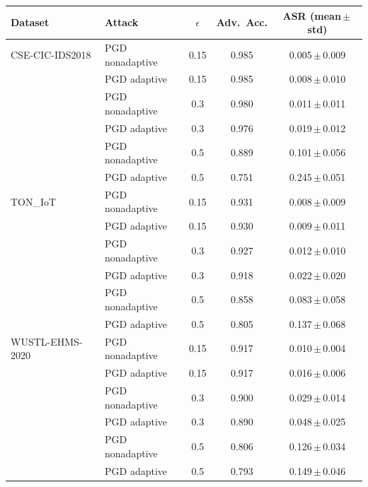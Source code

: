 \begin{tabular}{l l c c c}
\toprule
\textbf{Dataset} & \textbf{Attack} & $\epsilon$ & \textbf{Adv.\ Acc.} & \textbf{ASR} (mean\,$\pm$\,std) \\
\midrule
CSE-CIC-IDS2018 & PGD nonadaptive & 0.15 & 0.985 & 0.005\,$\pm$\,0.009 \\
 & PGD adaptive & 0.15 & 0.985 & 0.008\,$\pm$\,0.010 \\
 & PGD nonadaptive & 0.3 & 0.980 & 0.011\,$\pm$\,0.011 \\
 & PGD adaptive & 0.3 & 0.976 & 0.019\,$\pm$\,0.012 \\
 & PGD nonadaptive & 0.5 & 0.889 & 0.101\,$\pm$\,0.056 \\
 & PGD adaptive & 0.5 & 0.751 & 0.245\,$\pm$\,0.051 \\
TON\_IoT & PGD nonadaptive & 0.15 & 0.931 & 0.008\,$\pm$\,0.009 \\
 & PGD adaptive & 0.15 & 0.930 & 0.009\,$\pm$\,0.011 \\
 & PGD nonadaptive & 0.3 & 0.927 & 0.012\,$\pm$\,0.010 \\
 & PGD adaptive & 0.3 & 0.918 & 0.022\,$\pm$\,0.020 \\
 & PGD nonadaptive & 0.5 & 0.858 & 0.083\,$\pm$\,0.058 \\
 & PGD adaptive & 0.5 & 0.805 & 0.137\,$\pm$\,0.068 \\
WUSTL-EHMS-2020 & PGD nonadaptive & 0.15 & 0.917 & 0.010\,$\pm$\,0.004 \\
 & PGD adaptive & 0.15 & 0.917 & 0.016\,$\pm$\,0.006 \\
 & PGD nonadaptive & 0.3 & 0.900 & 0.029\,$\pm$\,0.014 \\
 & PGD adaptive & 0.3 & 0.890 & 0.048\,$\pm$\,0.025 \\
 & PGD nonadaptive & 0.5 & 0.806 & 0.126\,$\pm$\,0.034 \\
 & PGD adaptive & 0.5 & 0.793 & 0.149\,$\pm$\,0.046 \\
\bottomrule
\end{tabular}

